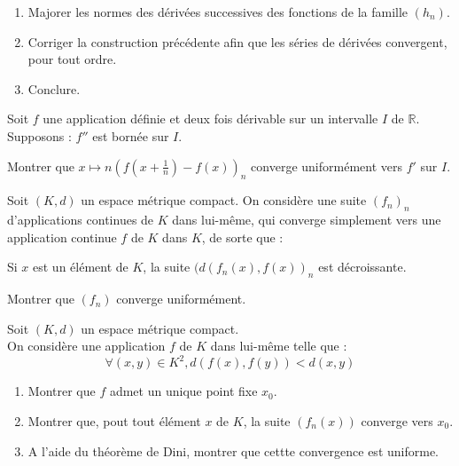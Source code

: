 \begin{exer}
\begin{enumerate}
\begin{enumerate}
\item Majorer les normes des d\'erivées successives des fonctions de la famille $(h_n)$.
\item Corriger la construction précédente afin que les s\'eries de d\'eriv\'ees convergent, pour tout ordre.
\item Conclure.
\end{enumerate}
\end{enumerate}
\end{exer}

\begin{exer}
Soit $f$ une application définie et deux fois dérivable sur un intervalle $I$ de $\mathbb{R}$. Supposons : $f''$ est bornée sur $I$.

Montrer que $x \mapsto n\left(f\left(x + \frac{1}{n}\right) - f(x)\right)_n$ converge uniformément vers $f'$ sur $I$.
\end{exer}

\begin{exer}
Soit $(K,d)$ un espace m\'etrique compact. %
On consid\`ere une suite $(f_n)_n$ d'applications continues de $K$ dans lui-m\^eme, %
qui converge simplement vers une application continue $f$ de $K$ dans $K$, de sorte que :
\begin{center}Si $x$ est un \'el\'ement de $K$, la suite $(d(f_n(x),f(x))_n$ est d\'ecroissante.\end{center}
Montrer que $(f_n)$ converge uniform\'ement.
\end{exer}

\begin{exer}
Soit $(K,d)$ un espace m\'etrique compact.\\
On consid\`ere une application $f$ de $K$ dans lui-m\^eme telle que :\[\forall (x,y) \in K^2 , d(f(x),f(y)) < d(x,y)\]
\begin{enumerate}
\item Montrer que $f$ admet un unique point fixe $x_0$.
\item Montrer que, pout tout \'el\'ement $x$ de $K$, la suite $(f_n(x))$ converge vers $x_0$.
\item A l'aide du th\'eor\`eme de Dini, montrer que cettte convergence est uniforme.
\end{enumerate}
\end{exer}